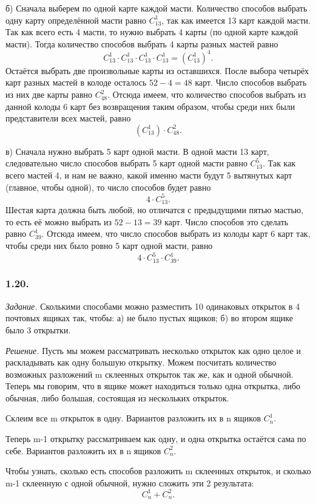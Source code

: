 \documentclass{book}
\begin{document}
б) Сначала выберем по одной карте каждой масти. Количество способов выбрать одну карту определённой масти равно $C_{13}^1$, так как имеется 13 карт каждой масти. Так как всего есть 4 масти, то нужно выбрать 4 карты (по одной карте каждой масти). Тогда количество способов выбрать 4 карты разных мастей равно $$C_{13}^1\cdot C_{13}^1\cdot C_{13}^1\cdot C_{13}^1=\left(C_{13}^1\right)^4.$$ Остаётся выбрать две произвольные карты из оставшихся. После выбора четырёх карт разных мастей в колоде осталось $52-4=48$ карт. Число способов выбрать из них две карты равно $C_{48}^2$. Отсюда имеем, что количество способов выбрать из данной колоды 6 карт без возвращения таким образом, чтобы среди них были представители всех мастей, равно $$\left(C_{13}^1\right)\cdot C_{48}^2.$$

в) Сначала нужно выбрать 5 карт одной масти. В одной масти 13 карт, следовательно число способов выбрать 5 карт одной масти равно $C_{13}^5$. Так как всего мастей 4, и нам не важно, какой именно масти будут 5 вытянутых карт (главное, чтобы одной), то число способов будет равно $$4\cdot C_{13}^5.$$ Шестая карта должна быть любой, но отличатся с предыдущими пятью мастью, то есть её можно выбрать из $52-13=39$ карт. Число способов это сделать равно $C_{39}^1$. Отсюда имеем, что число способов выбрать из колоды карт 6 карт так, чтобы среди них было ровно 5 карт одной масти, равно $$4\cdot C_{13}^5\cdot C_{39}^1.$$

\subsubsection*{1.20.}

\textit{Задание.} Сколькими способами можно разместить 10 одинаковых открыток в 4 почтовых ящиках так, чтобы: а) не было пустых ящиков; б) во втором ящике было 3 открытки.

\textit{Решение.} Пусть мы можем рассматривать несколько открыток как одно целое и раскладывать как одну большую открытку. Можем посчитать количество возможных разложений m склеенных открыток так же, как и одной обычной. Теперь мы говорим, что в ящике может находиться только одна открытка, либо обычная, либо большая, состоящая из нескольких открыток.

Склеим все m открыток в одну. Вариантов разложить их в n ящиков $C_n^1$.

Теперь m-1 открытку рассматриваем как одну, и одна открытка остаётся сама по себе. Вариантов разложить их в n ящиков $C_n^2$.

Чтобы узнать, сколько есть способов разложить m склеенных открыток, и сколько m-1 склеенную с одной обычной, нужно сложить эти 2 результата: $$C_n^1+C_n^2.$$
\end{document}
